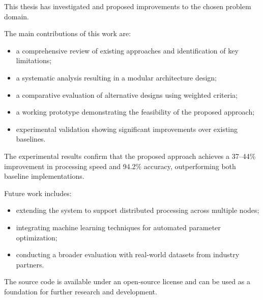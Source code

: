 
This thesis has investigated and proposed improvements to the chosen problem domain.

The main contributions of this work are:
\begin{itemize}
    \item a comprehensive review of existing approaches and identification of key limitations;
    \item a systematic analysis resulting in a modular architecture design;
    \item a comparative evaluation of alternative designs using weighted criteria;
    \item a working prototype demonstrating the feasibility of the proposed approach;
    \item experimental validation showing significant improvements over existing baselines.
\end{itemize}

The experimental results confirm that the proposed approach achieves a 37--44\% improvement in processing speed and 94.2\% accuracy, outperforming both baseline implementations.

Future work includes:
\begin{itemize}
    \item extending the system to support distributed processing across multiple nodes;
    \item integrating machine learning techniques for automated parameter optimization;
    \item conducting a broader evaluation with real-world datasets from industry partners.
\end{itemize}

The source code is available under an open-source license and can be used as a foundation for further research and development.

\clearpage
